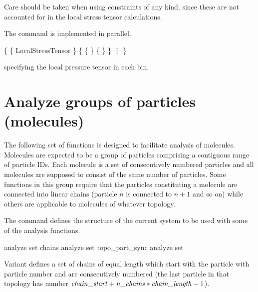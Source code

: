Care should be taken when using constraints of any kind, since these are not accounted for
in the local stress tensor calculations. 

The command is implemented in parallel.


\begin{code}
\{ \{ LocalStressTensor \}
   \{ \{    \} \{  \} \}
      \vdots
\}
\end{code}
specifying the local pressure tensor in each bin.

\section{Analyze groups of particles (molecules)}
\label{analyze:set}

The following set of functions is designed to facilitate analysis 
of molecules. Molecules are expected to be a group of particles
comprising a contiguous range of particle IDs. Each molecule
is a set of consecutively numbered particles and all molecules
are supposed to consist of the same number of particles.
Some functions in this group require that the particles constituting
a molecule are connected into linear chains (particle $n$ is connected
to $n+1$ and so on) while others are applicable to molecules
of whatever topology.

The  command defines the structure of the current
system to be used with some of the analysis functions.

\begin{essyntax}
   analyze set chains 
   analyze set topo\_part\_sync
   analyze set
\end{essyntax}

Variant  defines a set of  chains of equal
length  which start with the particle with particle
number  and are consecutively numbered (\ie the last
particle in that topology has number $\var{chain\_start} +
\var{n\_chains}*\var{chain\_length} - 1$). 

